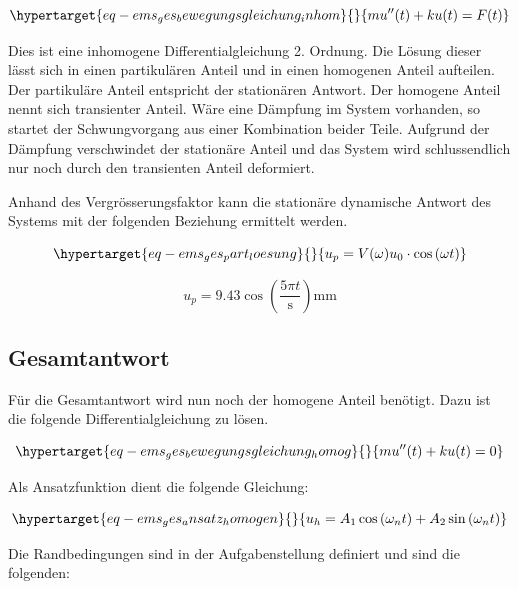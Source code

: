 \documentclass[
  letterpaper,
  DIV=11]{scrreprt}
\begin{document}
\begin{equation}\protect\hypertarget{eq-ems_ges_bewegungsgleichung_inhom}{}{
mu''(t)+ ku(t) = F(t)
}\label{eq-ems_ges_bewegungsgleichung_inhom}\end{equation}

Dies ist eine inhomogene Differentialgleichung 2. Ordnung. Die Lösung
dieser lässt sich in einen partikulären Anteil und in einen homogenen
Anteil aufteilen. Der partikuläre Anteil entspricht der stationären
Antwort. Der homogene Anteil nennt sich transienter Anteil. Wäre eine
Dämpfung im System vorhanden, so startet der Schwungvorgang aus einer
Kombination beider Teile. Aufgrund der Dämpfung verschwindet der
stationäre Anteil und das System wird schlussendlich nur noch durch den
transienten Anteil deformiert.

Anhand des Vergrösserungsfaktor kann die stationäre dynamische Antwort
des Systems mit der folgenden Beziehung ermittelt werden.

\begin{equation}\protect\hypertarget{eq-ems_ges_part_loesung}{}{
u_p = V(\omega)u_0 \cdot \cos{(\omega t)}
}\label{eq-ems_ges_part_loesung}\end{equation}

\begin{equation}u_{p} = 9.43 \cos{\left(\frac{5 \pi t}{\text{s}} \right)} \text{mm}\end{equation}

\hypertarget{gesamtantwort}{%
\subsection{Gesamtantwort}\label{gesamtantwort}}

Für die Gesamtantwort wird nun noch der homogene Anteil benötigt. Dazu
ist die folgende Differentialgleichung zu lösen.

\begin{equation}\protect\hypertarget{eq-ems_ges_bewegungsgleichung_homog}{}{
mu''(t)+ ku(t) = 0
}\label{eq-ems_ges_bewegungsgleichung_homog}\end{equation}

Als Ansatzfunktion dient die folgende Gleichung:

\begin{equation}\protect\hypertarget{eq-ems_ges_ansatz_homogen}{}{
u_h = A_1\cos{(\omega_n t)} + A_2 \sin{(\omega_n t)}
}\label{eq-ems_ges_ansatz_homogen}\end{equation}

Die Randbedingungen sind in der Aufgabenstellung definiert und sind die
folgenden:
\end{document}
